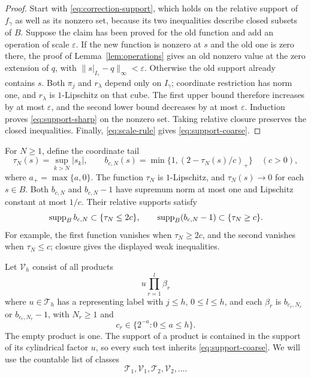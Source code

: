 \begin{proof}
Start with \eqref{eq:correction-support}, which holds on the relative support of \(f_\gamma\)
as well as its nonzero set, because its two inequalities describe
closed subsets of \(B\). Suppose the claim has been proved for the
old function and add an operation of scale \(\varepsilon\).
If the new function is nonzero at \(s\) and the old one is zero there,
the proof of Lemma~\ref{lem:operations} gives an old nonzero value
at the zero extension of \(q\), with
\(\|s|_{I_\gamma}-q\|_\infty<\varepsilon\). Otherwise the old
support already contains \(s\). Both \(\pi_j\) and \(r_\lambda\)
depend only on \(I_\gamma\); coordinate restriction has norm one,
and \(r_\lambda\) is \(1\)-Lipschitz on that cube. The first upper
bound therefore increases by at most \(\varepsilon\), and the
second lower bound decreases by at most \(\varepsilon\).
Induction proves \eqref{eq:support-sharp} on the nonzero set.
Taking relative closure preserves the closed inequalities. Finally,
\eqref{eq:scale-rule} gives \eqref{eq:support-coarse}.
\end{proof}

For \(N\geq1\), define the coordinate tail
\begin{equation}
 \tau_N(s)=\sup_{k>N}|s_k|,\qquad
 b_{c,N}(s)=\min\{1,(2-\tau_N(s)/c)_+\}\quad(c>0),
                                                               \label{eq:tail}
\end{equation}
where \(a_+=\max\{a,0\}\). The function \(\tau_N\) is
\(1\)-Lipschitz, and \(\tau_N(s)\to0\) for each \(s\in B\).
Both \(b_{c,N}\) and \(b_{c,N}-1\) have supremum norm at most one
and Lipschitz constant at most \(1/c\). Their relative supports satisfy
\begin{equation}
 \operatorname{supp}_B b_{c,N}\subset\{\tau_N\leq2c\},\qquad
 \operatorname{supp}_B(b_{c,N}-1)\subset\{\tau_N\geq c\}.                  \label{eq:tail-support}
\end{equation}
For example, the first function vanishes when \(\tau_N\geq2c\),
and the second vanishes when \(\tau_N\leq c\); closure gives the
displayed weak inequalities.

Let \(\mathcal V_h\) consist of all products
\begin{equation}
                         u\prod_{r=1}^l\beta_r              \label{eq:Vclass}
\end{equation}
where \(u\in\mathcal T_h\) has a representing label with \(j\leq h\),
\(0\leq l\leq h\), and each \(\beta_r\) is \(b_{c_r,N_r}\) or
\(b_{c_r,N_r}-1\), with \(N_r\geq1\) and
\[
                       c_r\in\{2^{-a}:0\leq a\leq h\}.
\]
The empty product is one. The support of a product is contained in
the support of its cylindrical factor \(u\), so every such test
inherits \eqref{eq:support-coarse}. We will use the countable list of
classes
\begin{equation}
               \mathcal T_1,\mathcal V_1,
               \mathcal T_2,\mathcal V_2,\ldots.             \label{eq:classes}
\end{equation}

